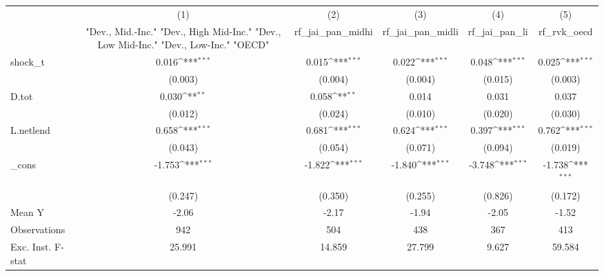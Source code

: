 {
\def\sym#1{\ifmmode^{#1}\else\(^{#1}\)\fi}
\begin{tabular}{l*{5}{c}}
\toprule
            &\multicolumn{1}{c}{(1)}&\multicolumn{1}{c}{(2)}&\multicolumn{1}{c}{(3)}&\multicolumn{1}{c}{(4)}&\multicolumn{1}{c}{(5)}\\
            &\multicolumn{1}{c}{ "Dev., Mid.-Inc." "Dev., High Mid-Inc." "Dev., Low Mid-Inc." "Dev., Low-Inc." "OECD" }&\multicolumn{1}{c}{rf\_jai\_pan\_midhi}&\multicolumn{1}{c}{rf\_jai\_pan\_midli}&\multicolumn{1}{c}{rf\_jai\_pan\_li}&\multicolumn{1}{c}{rf\_rvk\_oecd}\\
\midrule
shock\_t     &       0.016\sym{***}&       0.015\sym{***}&       0.022\sym{***}&       0.048\sym{***}&       0.025\sym{***}\\
            &     (0.003)         &     (0.004)         &     (0.004)         &     (0.015)         &     (0.003)         \\
\addlinespace
D.tot       &       0.030\sym{**} &       0.058\sym{**} &       0.014         &       0.031         &       0.037         \\
            &     (0.012)         &     (0.024)         &     (0.010)         &     (0.020)         &     (0.030)         \\
\addlinespace
L.netlend   &       0.658\sym{***}&       0.681\sym{***}&       0.624\sym{***}&       0.397\sym{***}&       0.762\sym{***}\\
            &     (0.043)         &     (0.054)         &     (0.071)         &     (0.094)         &     (0.019)         \\
\addlinespace
\_cons      &      -1.753\sym{***}&      -1.822\sym{***}&      -1.840\sym{***}&      -3.748\sym{***}&      -1.738\sym{***}\\
            &     (0.247)         &     (0.350)         &     (0.255)         &     (0.826)         &     (0.172)         \\
\midrule
Mean Y      &       -2.06         &       -2.17         &       -1.94         &       -2.05         &       -1.52         \\
Observations&         942         &         504         &         438         &         367         &         413         \\
Exc. Inst. F-stat&      25.991         &      14.859         &      27.799         &       9.627         &      59.584         \\
\bottomrule
\end{tabular}
}
